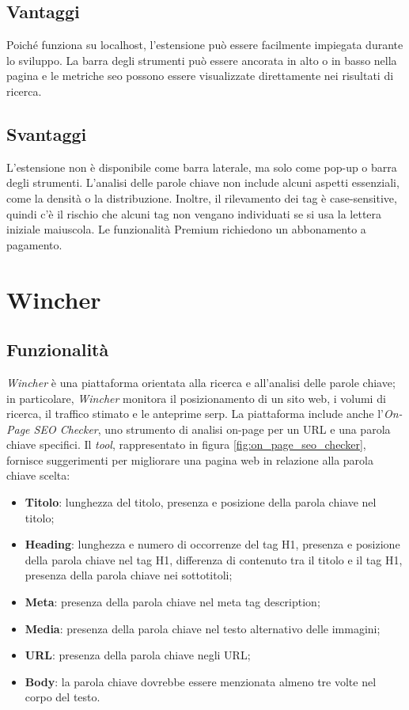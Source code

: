 \subsection{Vantaggi}
Poiché funziona su \gls{localhost}, l'estensione può essere facilmente impiegata durante lo sviluppo. La barra degli strumenti può essere ancorata in alto o in basso nella pagina e le metriche \gls{seo} possono essere visualizzate direttamente nei risultati di ricerca.

\subsection{Svantaggi}
L'estensione non è disponibile come barra laterale, ma solo come pop-up o barra degli strumenti. L'analisi delle parole chiave non include alcuni aspetti essenziali, come la densità o la distribuzione. Inoltre, il rilevamento dei tag è \gls{case-sensitive}, quindi c'è il rischio che alcuni tag non vengano individuati se si usa la lettera iniziale maiuscola. Le funzionalità Premium richiedono un abbonamento a pagamento. 

\section{Wincher}

\subsection{Funzionalità}
\textit{Wincher} è una piattaforma orientata alla ricerca e all'analisi delle parole chiave; in particolare, \textit{Wincher} monitora il posizionamento di un sito web, i volumi di ricerca, il traffico stimato e le anteprime \gls{serp}. La piattaforma include anche l'\textit{On-Page SEO Checker}, uno strumento di analisi \gls{on-page} per un URL e una parola chiave specifici. Il \textit{tool}, rappresentato in figura \ref{fig:on_page_seo_checker}, fornisce suggerimenti per migliorare una pagina web in relazione alla parola chiave scelta:
\begin{itemize}
    \item \textbf{Titolo}: lunghezza del titolo, presenza e posizione della parola chiave nel titolo;
    \item \textbf{Heading}: lunghezza e numero di occorrenze del tag H1, presenza e posizione della parola chiave nel tag H1, differenza di contenuto tra il titolo e il tag H1, presenza della parola chiave nei sottotitoli;
    \item \textbf{Meta}: presenza della parola chiave nel meta tag description;
    \item \textbf{Media}: presenza della parola chiave nel testo alternativo delle immagini;
    \item \textbf{URL}: presenza della parola chiave negli URL;
    \item \textbf{Body}: la parola chiave dovrebbe essere menzionata almeno tre volte nel corpo del testo.
\end{itemize}

